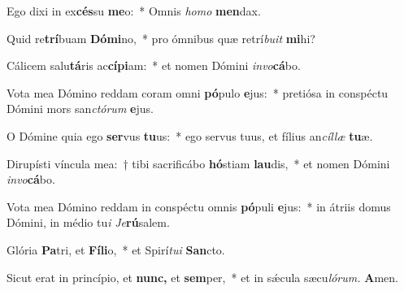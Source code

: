 \item Ego dixi in ex\textbf{cés}su \textbf{me}o:~* Omnis \textit{homo} \textbf{men}dax.
\item Quid re\textbf{trí}buam \textbf{Dó}\textbf{mi}no,~* pro ómnibus quæ retrí\textit{buit} \textbf{mi}hi?
\item Cálicem salu\textbf{tá}ris ac\textbf{cí}\textbf{pi}am:~* et nomen Dómini \textit{invo}\textbf{cá}bo.
\item Vota mea Dómino reddam coram omni \textbf{pó}pulo \textbf{e}jus:~* pretiósa in conspéctu Dómini mors san\textit{ctórum} \textbf{e}jus.
\item O Dómine quia ego \textbf{ser}vus \textbf{tu}us:~* ego servus tuus, et fílius an\textit{cíllæ} \textbf{tu}æ.
\item Dirupísti víncula mea:~† tibi sacrificábo \textbf{hó}stiam \textbf{lau}dis,~* et nomen Dómini \textit{invo}\textbf{cá}bo.
\item Vota mea Dómino reddam in conspéctu omnis \textbf{pó}puli \textbf{e}jus:~* in átriis domus Dómini, in médio tu\tinyhspace\textit{i} \textit{Je}\textbf{rú}salem.
\item Glória \textbf{Pa}tri, et \textbf{Fí}\textbf{li}o,~* et Spirí\tinyhspace\textit{tui} \textbf{San}cto.
\item Sicut erat in princípio, et \textbf{nunc,} et \textbf{sem}per,~* et in sǽcula sæcu\tinyhspace\textit{lórum.} \textbf{A}men.
